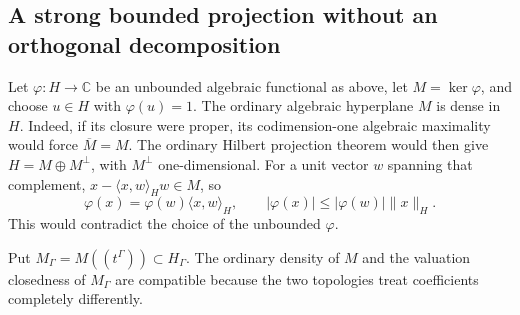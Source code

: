 \documentclass[11pt,letterpaper]{article}
\numberwithin{equation}{section}
\theoremstyle{definition}
\theoremstyle{remark}
\newcommand{\C}{\mathbb C}
\newcommand{\norm}[1]{\lVert#1\rVert}
\newcommand{\ip}[2]{\langle#1,#2\rangle}
\begin{document}
\subsection{A strong bounded projection without an orthogonal decomposition}
Let $\varphi:H\to\C$ be an unbounded algebraic functional as above,
let $M=\ker\varphi$, and choose $u\in H$ with $\varphi(u)=1$.
The ordinary algebraic hyperplane $M$ is dense in $H$.
Indeed, if its closure were proper, its codimension-one algebraic
maximality would force $\overline M=M$. The ordinary Hilbert projection
theorem would then give $H=M\oplus M^\perp$, with $M^\perp$
one-dimensional. For a unit vector $w$ spanning that complement,
$x-\ip{x}{w}_Hw\in M$, so
\[
 \varphi(x)=\varphi(w)\ip{x}{w}_H,
 \qquad |\varphi(x)|\le|\varphi(w)|\norm{x}_H.
\]
This would contradict the choice of the unbounded $\varphi$.

Put $M_\Gamma=M((t^\Gamma))\subset H_\Gamma$.
The ordinary density of $M$ and the valuation closedness of $M_\Gamma$
are compatible because the two topologies treat coefficients
completely differently.
\end{document}
